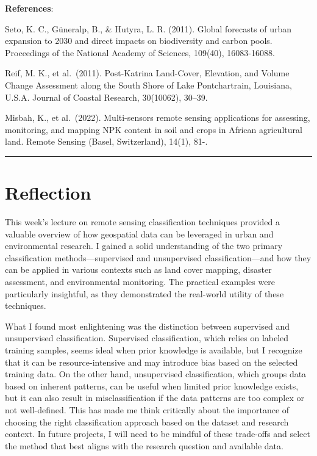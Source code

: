 \documentclass[
  letterpaper,
  DIV=11,
  numbers=noendperiod]{scrreprt}
\begin{document}
\textbf{References}:

Seto, K. C., Güneralp, B., \& Hutyra, L. R. (2011). Global forecasts of
urban expansion to 2030 and direct impacts on biodiversity and carbon
pools. Proceedings of the National Academy of Sciences, 109(40),
16083-16088.

Reif, M. K., et al.~(2011). Post-Katrina Land-Cover, Elevation, and
Volume Change Assessment along the South Shore of Lake Pontchartrain,
Louisiana, U.S.A. Journal of Coastal Research, 30(10062), 30--39.

Misbah, K., et al.~(2022). Multi-sensors remote sensing applications for
assessing, monitoring, and mapping NPK content in soil and crops in
African agricultural land. Remote Sensing (Basel, Switzerland), 14(1),
81-.

\begin{center}\rule{0.5\linewidth}{0.5pt}\end{center}

\section{Reflection}\label{reflection-4}

This week's lecture on remote sensing classification techniques provided
a valuable overview of how geospatial data can be leveraged in urban and
environmental research. I gained a solid understanding of the two
primary classification methods---supervised and unsupervised
classification---and how they can be applied in various contexts such as
land cover mapping, disaster assessment, and environmental monitoring.
The practical examples were particularly insightful, as they
demonstrated the real-world utility of these techniques.

What I found most enlightening was the distinction between supervised
and unsupervised classification. Supervised classification, which relies
on labeled training samples, seems ideal when prior knowledge is
available, but I recognize that it can be resource-intensive and may
introduce bias based on the selected training data. On the other hand,
unsupervised classification, which groups data based on inherent
patterns, can be useful when limited prior knowledge exists, but it can
also result in misclassification if the data patterns are too complex or
not well-defined. This has made me think critically about the importance
of choosing the right classification approach based on the dataset and
research context. In future projects, I will need to be mindful of these
trade-offs and select the method that best aligns with the research
question and available data.
\end{document}
